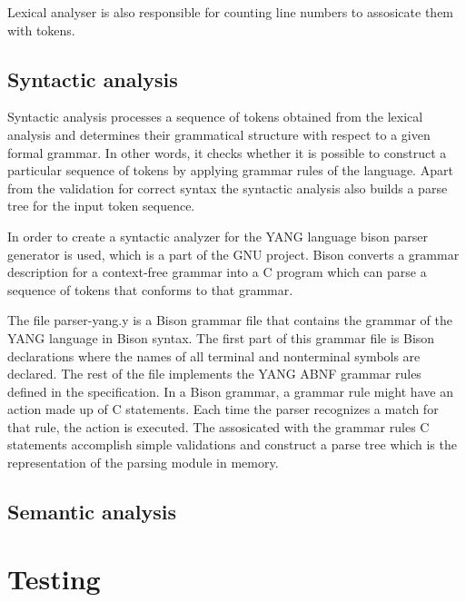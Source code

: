 \documentclass[conference]{IEEEtran}
\begin{document}
Lexical analyser is also responsible for counting line numbers to assosicate them with tokens.

\subsection{Syntactic analysis}
Syntactic analysis processes a sequence of tokens obtained from the lexical analysis and determines their grammatical structure with respect to a given formal grammar. In other words, it checks whether it is possible to construct a particular sequence of tokens by applying grammar rules of the language. Apart from the validation for correct syntax the syntactic analysis also builds a parse tree for the input token sequence. 

In order to create a syntactic analyzer for the YANG language bison parser generator \cite{bib6} is used, which is a part of the GNU project. Bison converts a grammar description for a context-free grammar into a C program which can parse a sequence of tokens that conforms to that grammar. 

The file parser-yang.y is a Bison grammar file that contains the grammar of the YANG language in Bison syntax. The first part of this grammar file is Bison declarations where the names of all terminal and nonterminal symbols are declared. The rest of the file implements the YANG ABNF grammar rules defined in the specification. In a Bison grammar, a grammar rule might have an action made up of C statements. Each time the parser recognizes a match for that rule, the action is executed. The assosicated with the grammar rules C statements accomplish simple validations and construct a parse tree which is the representation of the parsing module in memory.

\subsection{Semantic analysis}

\section{Testing}
\end{document}
